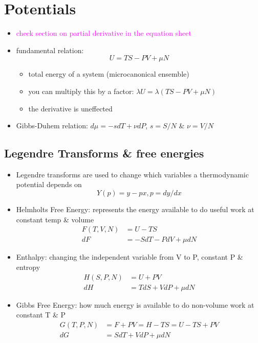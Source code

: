 
\section{Potentials}


\begin{itemize}
	\item \textcolor{magenta}{check section on partial derivative in the equation sheet}
	\item fundamental relation:
	      \begin{equation}
		      U = TS - PV + \mu N
	      \end{equation}
	      \begin{itemize}
		      \item total energy of a system (microcanonical ensemble)
		      \item you can multiply this by a factor: $\lambda U = \lambda (TS - PV + \mu N)$
		      \item the derivative is uneffected
	      \end{itemize}
	\item Gibbs-Duhem relation: $d\mu = -s dT + \nu dP$, $s = S/N$ \& $\nu = V/N$
\end{itemize}

\subsection*{Legendre Transforms \& free energies}
\begin{itemize}
	\item Legendre transforms are used to change which variables a thermodynamic potential depends on
	      \begin{equation*}
		      Y(p) = y - px, p = dy/dx
	      \end{equation*}
	\item Helmholts Free Energy: represents the energy available to do useful work at constant temp \& volume
	      \begin{align*}
		      F(T,V, N) & = U - TS                \\
		      dF        & = -S dT - P dV + \mu dN
	      \end{align*}

	\item Enthalpy: changing the independent variable from V to P, constant P \& entropy
	      \begin{align*}
		      H(S, P, N) & = U + PV               \\
		      dH         & = T dS + V dP + \mu dN
	      \end{align*}

	\item Gibbs Free Energy: how much energy is available to do non-volume work at constant T \& P
	      \begin{align*}
		      G(T, P, N) & = F + PV = H - TS = U -TS + PV \\
		      dG         & = S dT + V dP + \mu dN
	      \end{align*}

\end{itemize}

